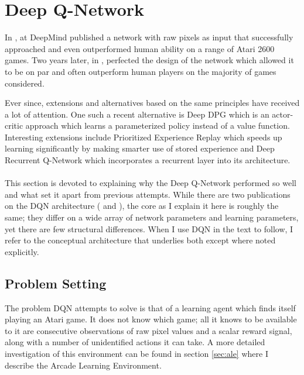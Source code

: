 \section{Deep Q-Network}
\label{sec:dqn}
In \citeyear{Mnih2013},
\citeauthor{Mnih2013} at DeepMind
published a network
with raw pixels as input
that successfully
approached and even outperformed human ability
on a range of Atari 2600 games.
Two years later,
in \citeyear{Mnih2015},
\citeauthor{Mnih2015}
perfected the design of the network
which allowed it to be on par
and often outperform human players
on the majority of games considered.

Ever since,
extensions and
alternatives based on the same principles
have received a lot of attention.
One such a recent alternative is
Deep DPG
\parencite{Lillicrap2016}
which is an actor-critic approach
which learns a parameterized policy
instead of a value function.
Interesting extensions include
Prioritized Experience Replay
\parencite{Schaul2016}
which speeds up learning significantly
by making smarter use of stored experience
and
Deep Recurrent Q-Network
\parencite{Hausknecht2015}
which incorporates
a recurrent layer into its architecture.

\paragraph{}
This section is devoted to explaining why the Deep Q-Network
performed so well and what set it apart from previous attempts.
While there are two publications on the DQN architecture
(\citeyear{Mnih2013} and \citeyear{Mnih2015}),
the core as I explain it here is roughly the same;
they differ on a wide array of network parameters and learning parameters,
yet there are few structural differences.
When I use DQN in the text to follow,
I refer to the conceptual architecture that underlies both
except where noted explicitly.

\subsection{Problem Setting}
\label{sub:dqn_problem_setting}
The problem DQN attempts to solve
is that of a learning agent which finds itself playing an Atari game.
It does not know which game;
all it knows to be available to it
are consecutive observations of raw pixel values
and a scalar reward signal,
along with a number of unidentified actions it can take.
A more detailed investigation of this environment
can be found in section \ref{sec:ale}
where I describe the Arcade Learning Environment.

